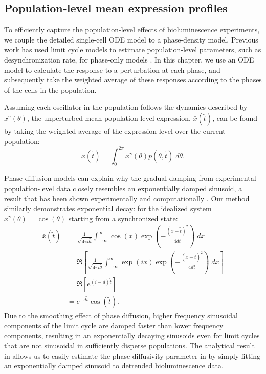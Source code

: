 \subsection{Population-level mean expression profiles}

To efficiently capture the population-level effects of bioluminescence experiments, we couple the detailed single-cell ODE model to a phase-density model.
Previous work has used limit cycle models to estimate population-level parameters, such as desynchronization rate, for phase-only models \cite{Rougemont2007}.
In this chapter, we use an ODE model to calculate the response to a perturbation at each phase, and subsequently take the weighted average of these responses according to the phases of the cells in the population.

Assuming each oscillator in the population follows the dynamics described by $x^\gamma(\theta)$, the unperturbed mean population-level expression, $\bar{x}(\tilde{t})$, can be found by taking the weighted average of the expression level over the current population:
\begin{equation}
  \bar{x}(\tilde{t}) = \int_0^{2\pi} x^\gamma(\theta) p(\theta, \tilde{t}) \; d\theta.
  \label{eq:xbar}
\end{equation}

Phase-diffusion models can explain why the gradual damping from experimental population-level data closely resembles an exponentially damped sinusoid, a result that has been shown experimentally \cite{Welsh2004} and computationally \cite{Rougemont2007}.
Our method similarly demonstrates exponential decay: for the idealized system $x^\gamma(\theta) = \cos(\theta)$ starting from a synchronized state:
\begin{align}
  \bar{x}(\tilde{t}) &= \frac{1}{\sqrt{4\pi d\tilde{t}}}\int_{-\infty}^{\infty} \cos(x) \exp\left(-\frac{(x - \tilde{t})^2}{4d\tilde{t}}\right)\; dx \\
  &= \Re\left[\frac{1}{\sqrt{4\pi d\tilde{t}}}\int_{-\infty}^{\infty} \exp(ix) \exp\left(-\frac{(x - \tilde{t})^2}{4d\tilde{t}}\right)\; dx\right] \\
    &= \Re\left[e^{(i - d)\tilde{t}}\right]\\
    &= e^{-d\tilde{t}} \cos(\tilde{t}).
    \label{eq:expsin}
\end{align}
Due to the smoothing effect of phase diffusion, higher frequency sinusoidal components of the limit cycle are damped faster than lower frequency components, resulting in an exponentially decaying sinusoids even for limit cycles that are not sinusoidal in sufficiently disperse populations.
The analytical result in  allows us to easily estimate the phase diffusivity parameter in  by simply fitting an exponentially damped sinusoid to detrended bioluminescence data.

